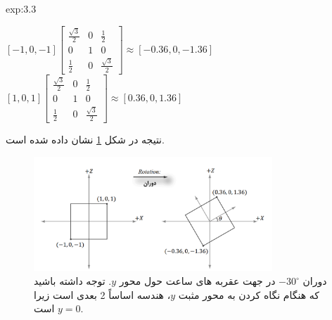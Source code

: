 {\begin{spacing}{1.5}
\begin{example}{exp:3.3}
            \begin{center}
                $[-1,0,-1]\begin{bmatrix}
                              \frac{\displaystyle \sqrt{\displaystyle 3}}{\displaystyle 2} & 0 & \frac{\displaystyle 1}{\displaystyle 2}                      \\
                              0                                                            & 1 & 0                                                            \\
                              \frac{\displaystyle 1}{\displaystyle 2}                      & 0 & \frac{\displaystyle \sqrt{\displaystyle 3}}{\displaystyle 2}
                \end{bmatrix}\approx[-0.36,0,-1.36]$\\
                $[1,0,1]\begin{bmatrix}
                            \frac{\displaystyle \sqrt{\displaystyle 3}}{\displaystyle 2} & 0 & \frac{\displaystyle 1}{\displaystyle 2}                      \\
                            0                                                            & 1 & 0                                                            \\
                            \frac{\displaystyle 1}{\displaystyle 2}                      & 0 & \frac{\displaystyle \sqrt{\displaystyle 3}}{\displaystyle 2}
                \end{bmatrix}\approx[0.36,0,1.36]$
            \end{center}

            نتیجه در شکل \ref{fig:4.Session.1.3.4} نشان داده شده است.

            \begin{figure}[H]
                \centering
                \setlength{\belowcaptionskip}{-10pt}
                \includegraphics[width=0.8\textwidth]{Images/4/3/4.Session.1.3.4}
                \caption {دوران $-30^\circ$ در جهت عقربه های ساعت حول محور $y$.
                توجه داشته باشید که هنگام نگاه کردن به محور مثبت $y$، هندسه اساساً 2 بعدی است زیرا $y=0$ است. \textbf{\vspace{20pt}}}
                \label{fig:4.Session.1.3.4}
            \end{figure}
        \end{example}
    \end{spacing}
}


